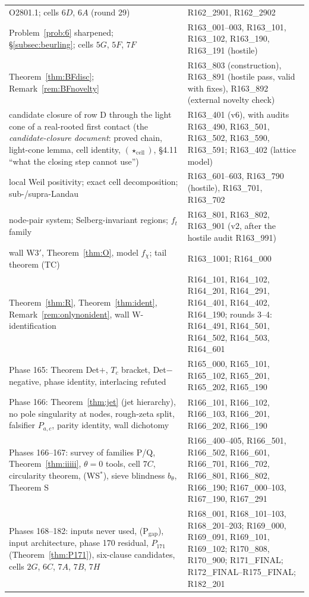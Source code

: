 \documentclass[11pt]{amsart}
\theoremstyle{definition}
\theoremstyle{remark}
\begin{document}
\begin{center}
\begin{tabularx}{\textwidth}{@{}p{5.2cm}Y@{}}
O2801.1; cells $6D$, $6A$ (round 29) & R162\_2901, R162\_2902 \\
Problem~\ref{prob:6} sharpened; \S\ref{subsec:beurling}; cells $5G$, $5F$, $7F$ & R163\_001--003, R163\_101, R163\_102, R163\_190, R163\_191 (hostile) \\
Theorem~\ref{thm:BFdisc}; Remark~\ref{rem:BFnovelty} & R163\_803 (construction), R163\_891 (hostile pass, valid with fixes), R163\_892 (external novelty check) \\
candidate closure of row D through the light cone of a real-rooted first contact (the \emph{candidate-closure document}: proved chain, light-cone lemma, cell identity, $(\star_{\mathrm{cell}})$, \S4.11 ``what the closing step cannot use'') & R163\_401 (v6), with audits R163\_490, R163\_501, R163\_502, R163\_590, R163\_591; R163\_402 (lattice model) \\
local Weil positivity; exact cell decomposition; sub-/supra-Landau & R163\_601--603, R163\_790 (hostile), R163\_701, R163\_702 \\
node-pair system; Selberg-invariant regions; $f_t$ family & R163\_801, R163\_802, R163\_901 (v2, after the hostile audit R163\_991) \\
wall W3$'$, Theorem~\ref{thm:O}, model $f_\chi$; tail theorem (TC) & R163\_1001; R164\_000 \\
Theorem~\ref{thm:R}, Theorem~\ref{thm:ident}, Remark~\ref{rem:onlynonident}, wall W-identification & R164\_101, R164\_102, R164\_201, R164\_291, R164\_401, R164\_402, R164\_190; rounds 3--4: R164\_491, R164\_501, R164\_502, R164\_503, R164\_601 \\
Phase 165: Theorem Det$+$, $T_c$ bracket, Det$-$ negative, phase identity, interlacing refuted & R165\_000, R165\_101, R165\_102, R165\_201, R165\_202, R165\_190 \\
Phase 166: Theorem~\ref{thm:jet} (jet hierarchy), no pole singularity at nodes, rough-zeta split, falsifier $P_{a,c}$, parity identity, wall dichotomy & R166\_101, R166\_102, R166\_103, R166\_201, R166\_202, R166\_190 \\
Phases 166--167: survey of families P/Q, Theorem~\ref{thm:iiiii}, $\theta=0$ tools, cell $7C$, circularity theorem, (WS$^*$), sieve blindness $b_\theta$, Theorem S & R166\_400--405, R166\_501, R166\_502, R166\_601, R166\_701, R166\_702, R166\_801, R166\_802, R166\_190; R167\_000--103, R167\_190, R167\_291 \\
Phases 168--182: inputs never used, (P$_{\mathrm{gap}}$), input architecture, phase 170 residual, $P_{171}$ (Theorem~\ref{thm:P171}), six-clause candidates, cells $2G$, $6C$, $7A$, $7B$, $7H$ & R168\_001, R168\_101--103, R168\_201--203; R169\_000, R169\_091, R169\_101, R169\_102; R170\_808, R170\_900; R171\_FINAL; R172\_FINAL--R175\_FINAL; R182\_201 \\

\end{tabularx}
\end{center}
\end{document}
